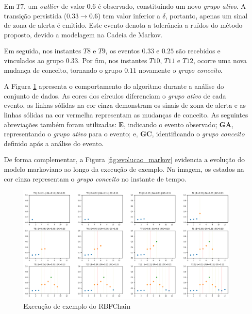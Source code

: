 \documentclass[msc, classic, a4paper]{ufbathesis}
\begin{document}
Em $T7$, um \textit{outlier} de valor $0.6$ é observado, constituindo um novo \textit{grupo ativo}. A transição persistida ($0.33 \rightarrow 0.6$) tem valor inferior a $\delta$, portanto, apenas um sinal de zona de alerta é emitido.
Este evento denota a tolerância a ruídos do método proposto, devido a modelagem na Cadeia de Markov.

Em seguida, nos instantes $T8$ e $T9$, os eventos $0.33$ e $0.25$ são recebidos e vinculados ao grupo $0.33$. 
Por fim, nos instantes $T10$, $T11$ e $T12$, ocorre uma nova mudança de conceito, tornando o grupo $0.11$ novamente o \textit{grupo conceito}.

A Figura \ref{fig:funcionamento_algoritmo} apresenta o comportamento do algoritmo durante a análise do conjunto de dados. As cores dos círculos diferenciam o \textit{grupo ativo} de cada evento, as linhas sólidas na cor cinza demonstram os sinais de zona de alerta e as linhas sólidas na cor vermelha representam as mudanças de conceito. As seguintes abreviações também foram utilizadas: \textbf{E}, indicando o evento observado; \textbf{GA}, representando o \textit{grupo ativo} para o evento; e, \textbf{GC}, identificando o \textit{grupo conceito} definido após a análise do evento.

De forma complementar, a Figura \ref{fig:evolucao_markov} evidencia a evolução do modelo markoviano ao longo da execução de exemplo. Na imagem, os estados na cor cinza representam o \textit{grupo conceito} no instante de tempo.

\begin{landscape}
    \begin{figure}[ht]
    \begin{center}
        \includegraphics[scale=0.7]{imagens/funcionamento_algoritmo.png}
        \caption{Execução de exemplo do RBFChain}
        \label{fig:funcionamento_algoritmo}
    \end{center}
    \end{figure}
\end{landscape}
\end{document}
